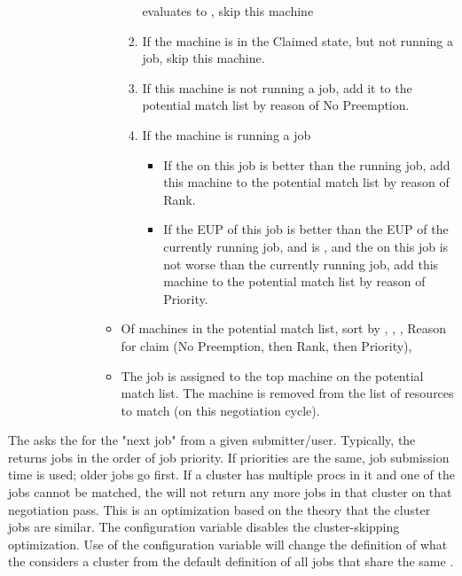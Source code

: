 \begin{enumerate}
\begin{description}
\begin{description}
\begin{itemize}
\begin{enumerate}
		   evaluates to ,
		  skip this machine
		  \item If the machine is in the Claimed state, but
		  not running a job, skip this machine.
		  \item If this machine is not running a job, add it to
		  the potential match list by reason of
		  No Preemption.
		  \item If the machine is running a job
                    \begin{itemize}
		    \item If the  on this job is
		    better than the running job, add this machine to the
		    potential match list by reason of Rank.
		    \item  If the EUP of this job is better than the EUP
		    of the currently running job, and
		     is ,
		    and the  on this job is not worse
		    than the currently running job, add this machine to the
		    potential match list by reason of Priority.
                    \end{itemize}
                  \end{enumerate}
	        \item Of machines in the potential match list, sort by
		, ,
		, Reason for claim
		(No Preemption, then Rank, then Priority),
	        \item The job is assigned to the top machine on the
		potential match list.  The machine is removed
		from the list of resources to match
		(on this negotiation cycle).
              \end{itemize}
          \end{description}
    \end{description}
\end{enumerate}

The  asks the  for the 
"next job" from a given submitter/user.
Typically, the  returns jobs in the order of
job priority.
If priorities are the same,
job submission time is used; older jobs go first.
If a cluster has multiple procs in it and one of the jobs cannot be matched,
the  will not return any more jobs in that cluster
on that negotiation pass.
This is an optimization based on the theory that the cluster jobs are similar.
The configuration variable 
disables the cluster-skipping optimization.
Use of the configuration variable 
will change the
definition of what the  considers a cluster from the
default definition of all jobs that share the same .


